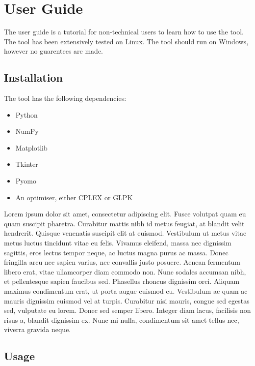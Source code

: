 \chapter{User Guide}

The user guide is a tutorial for non-technical users to learn how to use the tool. The tool has been extensively tested on Linux. The tool should run on Windows, however no guarentees are made.

\section{Installation}

The tool has the following dependencies:

\begin{itemize}
	\item Python
	\item NumPy
	\item Matplotlib
	\item Tkinter
	\item Pyomo
	\item An optimiser, either CPLEX or GLPK
\end{itemize}

Lorem ipsum dolor sit amet, consectetur adipiscing elit. Fusce volutpat quam eu quam suscipit pharetra. Curabitur mattis nibh id metus feugiat, at blandit velit hendrerit. Quisque venenatis suscipit elit at euismod. Vestibulum ut metus vitae metus luctus tincidunt vitae eu felis. Vivamus eleifend, massa nec dignissim sagittis, eros lectus tempor neque, ac luctus magna purus ac massa. Donec fringilla arcu nec sapien varius, nec convallis justo posuere. Aenean fermentum libero erat, vitae ullamcorper diam commodo non. Nunc sodales accumsan nibh, et pellentesque sapien faucibus sed. Phasellus rhoncus dignissim orci. Aliquam maximus condimentum erat, ut porta augue euismod eu. Vestibulum ac quam ac mauris dignissim euismod vel at turpis. Curabitur nisi mauris, congue sed egestas sed, vulputate eu lorem. Donec sed semper libero. Integer diam lacus, facilisis non risus a, blandit dignissim ex. Nunc mi nulla, condimentum sit amet tellus nec, viverra gravida neque.

\section{Usage}

